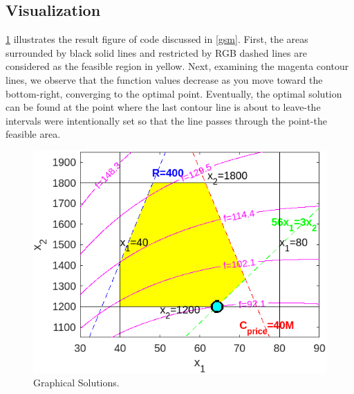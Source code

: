 \documentclass[11pt,twocolumn]{article}
\begin{document}
        \subsection{Visualization}
            \label{vis}
                \cref{graphical} illustrates the result figure of code discussed in \cref{gsm}.
                First, the areas surrounded by black solid lines and restricted by RGB dashed lines are considered as the feasible region in yellow.
                Next, examining the magenta contour lines, we observe that the function values decrease as you move toward the bottom-right, converging to the optimal point.
                Eventually, the optimal solution can be found at the point where the last contour line is about to leave-the intervals were intentionally set so that the line passes through the point-the feasible area.
                \begin{figure}[h]
                    \centering
                    \includegraphics[width=.9\columnwidth]{graphical.png}
                    \caption{Graphical Solutions.}
                    \label{graphical}
                \end{figure}
\end{document}
